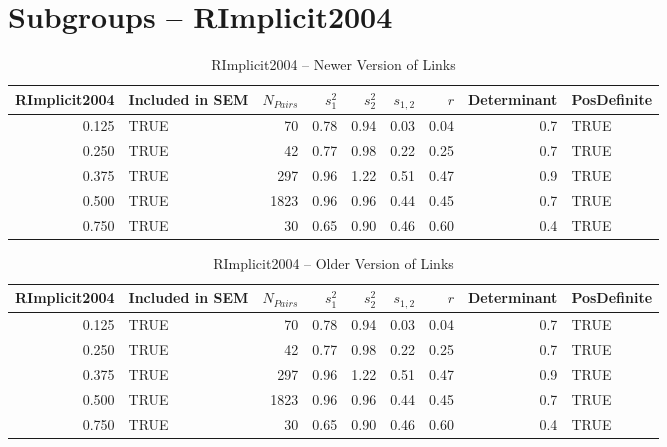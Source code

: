 \documentclass{article}\usepackage[]{graphicx}\usepackage[]{color}
\begin{document}
\section{Subgroups --  RImplicit2004 }%
\begin{table}[ht]
\centering
\begin{tabular}{rlrrrrrrl}
  \hline
RImplicit2004 & Included in SEM & $N_{Pairs}$ & $s_1^2$ & $s_2^2$ & $s_{1,2}$ & $r$ & Determinant & PosDefinite \\ 
  \hline
0.125 & TRUE & 70 & 0.78 & 0.94 & 0.03 & 0.04 & 0.7 & TRUE \\ 
  0.250 & TRUE & 42 & 0.77 & 0.98 & 0.22 & 0.25 & 0.7 & TRUE \\ 
  0.375 & TRUE & 297 & 0.96 & 1.22 & 0.51 & 0.47 & 0.9 & TRUE \\ 
  0.500 & TRUE & 1823 & 0.96 & 0.96 & 0.44 & 0.45 & 0.7 & TRUE \\ 
  0.750 & TRUE & 30 & 0.65 & 0.90 & 0.46 & 0.60 & 0.4 & TRUE \\ 
   \hline
\end{tabular}
\caption{RImplicit2004 -- Newer Version of Links} 
\end{table}
\begin{table}[ht]
\centering
\begin{tabular}{rlrrrrrrl}
  \hline
RImplicit2004 & Included in SEM & $N_{Pairs}$ & $s_1^2$ & $s_2^2$ & $s_{1,2}$ & $r$ & Determinant & PosDefinite \\ 
  \hline
0.125 & TRUE & 70 & 0.78 & 0.94 & 0.03 & 0.04 & 0.7 & TRUE \\ 
  0.250 & TRUE & 42 & 0.77 & 0.98 & 0.22 & 0.25 & 0.7 & TRUE \\ 
  0.375 & TRUE & 297 & 0.96 & 1.22 & 0.51 & 0.47 & 0.9 & TRUE \\ 
  0.500 & TRUE & 1823 & 0.96 & 0.96 & 0.44 & 0.45 & 0.7 & TRUE \\ 
  0.750 & TRUE & 30 & 0.65 & 0.90 & 0.46 & 0.60 & 0.4 & TRUE \\ 
   \hline
\end{tabular}
\caption{RImplicit2004 -- Older Version of Links} 
\end{table}


\end{document}
